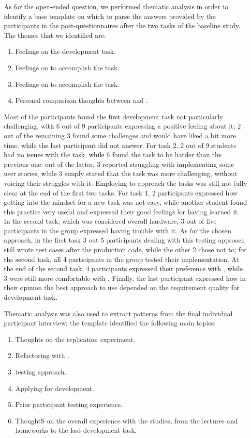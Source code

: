 As for the open-ended question, we performed thematic analysis in order to identify a base template on which to parse the answers provided by the participants in the post-questionnaires after the two tasks of the baseline study.
The themes that we identified are:
\begin{enumerate}
    \item Feelings on the development task.
    \item Feelings on \tdd to accomplish the task.
    \item Feelings on \notdd to accomplish the task.
    \item Personal comparison thoughts between \tdd and \notdd.
\end{enumerate}

Most of the participants found the first development task not particularly challenging, with 6 out of 9 participants expressing a positive feeling about it; 2 out of the remaining 3 found some challenges and would have liked a bit more time, while the last participant did not answer. 
For task 2, 2 out of 9 students had no issues with the task, while 6 found the task to be harder than the previous one: out of the latter, 3 reported struggling with implementing some user stories, while 3 simply stated that the task was more challenging, without voicing their struggles with it.
Employing \tdd to approach the tasks was still not fully clear at the end of the first two tasks. For task 1, 2 participants expressed how getting into the \tdd mindset for a new task was not easy, while another student found this practice very useful and expressed their good feelings for having learned it. 
In the second task, which was considered overall hardware, 3 out of five participants in the \tdd group expressed having trouble with it.
As for the chosen \notdd approach, in the first task 3 out 5 participants dealing with this testing approach still wrote test cases after the production code, while the other 2 chose not to; for the second task, all 4 participants in the \notdd group tested their implementation.
At the end of the second task, 4 participants expressed their preference with \tdd, while 3 were still more comfortable with \notdd. Finally, the last participant expressed how in their opinion the best approach to use depended on the requirement quality  for development task.

Thematic analysis was also used to extract patterns from the final individual participant interview; the template identified the following main topics: 
\begin{enumerate}
    \item Thoughts on the replication experiment.
    \item Refactoring with \tdd.
    \item \notdd testing approach.
    \item Applying \tdd for \ess development.
    \item Prior participant testing experience.
    \item ThoughtS on the overall experience with the studies, from the lectures and homeworks to the last development task.
\end{enumerate}

